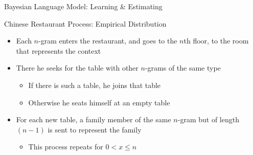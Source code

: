 \begin{frame}{Bayesian Language Model: Learning \& Estimating}
    \begin{block}{Chinese Restaurant Process: Empirical Distribution}
        \begin{itemize}
            \item Each $n$-gram enters the restaurant, and goes to the $n$th floor, to the room that represents the context
            \item There he seeks for the table with other $n$-grams of the same type
                \begin{itemize}
                    \item If there is such a table, he joins that table
                    \item Otherwise he seats himself at an empty table
                \end{itemize}
            \item For each new table, a family member of the same $n$-gram but of length $(n-1)$ is sent to represent the family
                \begin{itemize}
                    \item This process repeats for $0 < x \leq n$
                \end{itemize}
        \end{itemize}
    \end{block}

\end{frame}

